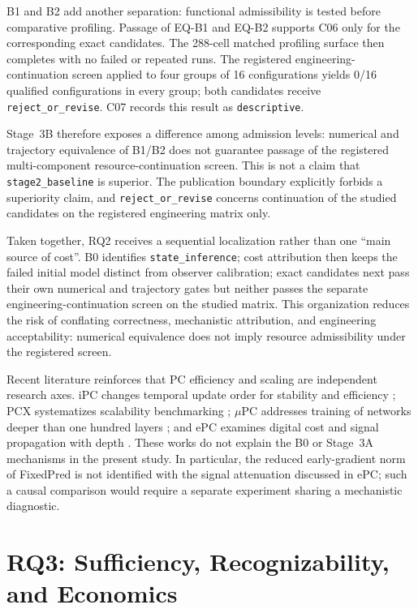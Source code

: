 B1 and B2 add another separation: functional admissibility is tested before comparative
profiling. Passage of EQ-B1 and EQ-B2 supports C06 only for the corresponding exact
candidates. The 288-cell matched profiling surface then completes with no failed or
repeated runs. The registered engineering-continuation screen applied to four groups of
16 configurations yields 0/16 qualified configurations in every group; both candidates
receive \texttt{reject\_or\_revise}. C07 records this result as \texttt{descriptive}.

Stage~3B therefore exposes a difference among admission levels: numerical and trajectory
equivalence of B1/B2 does not guarantee passage of the registered multi-component
resource-continuation screen. This is not a claim that
\texttt{stage2\_baseline} is superior. The publication boundary explicitly forbids a
superiority claim, and \texttt{reject\_or\_revise} concerns continuation of the studied
candidates on the registered engineering matrix only.

Taken together, RQ2 receives a sequential localization rather than one ``main source of
cost''. B0 identifies \texttt{state\_inference}; cost attribution then keeps the failed
initial model distinct from observer calibration; exact candidates next pass their own
numerical and trajectory gates but neither passes the separate engineering-continuation
screen on the studied matrix. This organization reduces the risk of conflating
correctness, mechanistic attribution, and engineering acceptability: numerical
equivalence does not imply resource admissibility under the registered screen.

Recent literature reinforces that PC efficiency and scaling are independent research
axes. iPC changes temporal update order for stability and efficiency
\cite{salvatori2024stable}; PCX systematizes scalability benchmarking
\cite{pinchetti2025benchmarking}; $\mu$PC addresses training of networks deeper than
one hundred layers \cite{innocenti2025mupc}; and ePC examines digital cost and signal
propagation with depth \cite{goemaere2026epc}. These works do not explain the B0 or
Stage~3A mechanisms in the present study. In particular, the reduced early-gradient
norm of FixedPred is not identified with the signal attenuation discussed in ePC; such
a causal comparison would require a separate experiment sharing a mechanistic
diagnostic.

\section{RQ3: Sufficiency, Recognizability, and Economics}
\label{sec:discussion-rq3-en}


